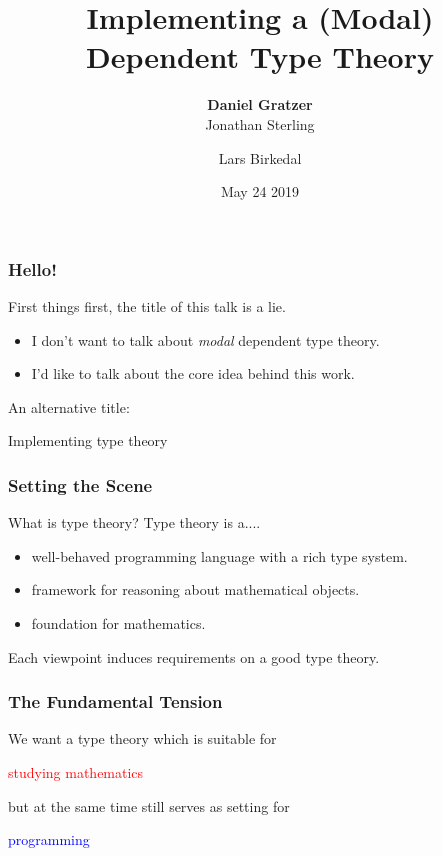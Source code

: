 \documentclass[usenames,dvipsnames,aspectratio=169,12pt]{beamer}
\title{Implementing a (Modal) Dependent Type Theory}
\author{\textbf{Daniel Gratzer}\inst{1}\\%
  Jonathan Sterling\inst{2} \and Lars Birkedal\inst{1}}
\institute{\inst{1} This University \smiley{} \\ \inst{2} Not This University \frownie{}}
\date{May 24 2019}
\begin{document}
\begin{frame}[noframenumbering]
  \titlepage
\end{frame}

\begin{frame}
  \frametitle{Hello!}
  First things first, the title of this talk is a lie.
  \pause

  \begin{itemize}
  \item I don't want to talk about \emph{modal} dependent type theory.
  \item I'd like to talk about the core idea behind this work.
  \end{itemize}
  \pause
  \bigskip

  An alternative title:
  \begin{center}
    \color{Blue}
    \Large
    Implementing type theory
  \end{center}

\end{frame}

\begin{frame}
  \frametitle{Setting the Scene}

  What is type theory? Type theory is a....
  \begin{itemize}
  \item well-behaved programming language with a rich type system.

  \item framework for reasoning about mathematical objects.

  \item foundation for mathematics.
  \end{itemize}
  \pause\pause\pause
  \bigskip


  Each viewpoint induces requirements on a good type theory.
\end{frame}

\begin{frame}
  \frametitle{The Fundamental Tension}

  We want a type theory which is suitable for

  \begin{center}
    \textcolor{Red}{studying mathematics}
  \end{center}

  but at the same time still serves as setting for

  \begin{center}
    \textcolor{Blue}{programming}
  \end{center}

\end{frame}
\end{document}
